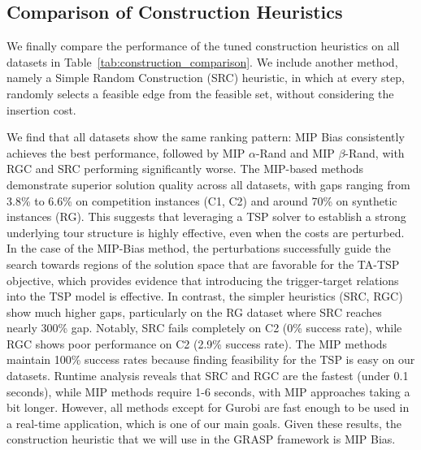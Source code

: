 \documentclass[twocolumn, switch]{article} %
\begin{document}
\subsection{Comparison of Construction Heuristics}

We finally compare the performance of the tuned construction heuristics on all datasets in Table~\ref{tab:construction_comparison}.
We include another method, namely a Simple Random Construction (SRC) heuristic, in which at every step, randomly selects a feasible edge from the feasible set, without considering the insertion cost.

We find that all datasets show the same ranking pattern: MIP Bias consistently achieves the best performance, followed by MIP $\alpha$-Rand and MIP $\beta$-Rand, with RGC and SRC performing significantly worse.
The MIP-based methods demonstrate superior solution quality across all datasets, with gaps ranging from 3.8\% to 6.6\% on competition instances (C1, C2) and around 70\% on synthetic instances (RG).
This suggests that leveraging a TSP solver to establish a strong underlying tour structure is highly effective, even when the costs are perturbed.
In the case of the MIP-Bias method, the perturbations successfully guide the search towards regions of the solution space that are favorable for the TA-TSP objective, which provides evidence that introducing the trigger-target relations into the TSP model is effective.
In contrast, the simpler heuristics (SRC, RGC) show much higher gaps, particularly on the RG dataset where SRC reaches nearly 300\% gap. Notably, SRC fails completely on C2 (0\% success rate), while RGC shows poor performance on C2 (2.9\% success rate).
The MIP methods maintain 100\% success rates because finding feasibility for the TSP is easy on our datasets. Runtime analysis reveals that SRC and RGC are the fastest (under 0.1 seconds), while MIP methods require 1-6 seconds, with MIP approaches taking a bit longer.
However, all methods except for Gurobi are fast enough to be used in a real-time application, which is one of our main goals.
Given these results, the construction heuristic that we will use in the GRASP framework is MIP Bias.
\end{document}
